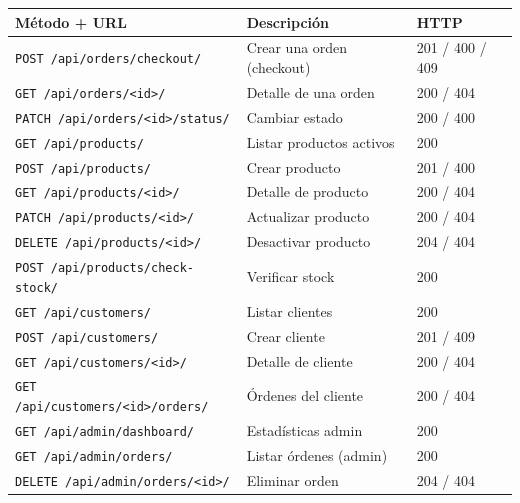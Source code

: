 \documentclass[12pt, a4paper]{article}
\begin{document}
\begin{center}
\begin{tabular}{@{}lll@{}}
\toprule
\textbf{Método + URL} & \textbf{Descripción} & \textbf{HTTP} \\
\midrule
\texttt{POST /api/orders/checkout/} & Crear una orden (checkout) & 201 / 400 / 409 \\
\texttt{GET /api/orders/<id>/}      & Detalle de una orden & 200 / 404 \\
\texttt{PATCH /api/orders/<id>/status/} & Cambiar estado & 200 / 400 \\
\midrule
\texttt{GET /api/products/}         & Listar productos activos & 200 \\
\texttt{POST /api/products/}        & Crear producto & 201 / 400 \\
\texttt{GET /api/products/<id>/}    & Detalle de producto & 200 / 404 \\
\texttt{PATCH /api/products/<id>/}  & Actualizar producto & 200 / 404 \\
\texttt{DELETE /api/products/<id>/} & Desactivar producto & 204 / 404 \\
\texttt{POST /api/products/check-stock/} & Verificar stock & 200 \\
\midrule
\texttt{GET /api/customers/}        & Listar clientes & 200 \\
\texttt{POST /api/customers/}       & Crear cliente & 201 / 409 \\
\texttt{GET /api/customers/<id>/}   & Detalle de cliente & 200 / 404 \\
\texttt{GET /api/customers/<id>/orders/} & Órdenes del cliente & 200 / 404 \\
\midrule
\texttt{GET /api/admin/dashboard/}  & Estadísticas admin & 200 \\
\texttt{GET /api/admin/orders/}     & Listar órdenes (admin) & 200 \\
\texttt{DELETE /api/admin/orders/<id>/} & Eliminar orden & 204 / 404 \\
\bottomrule
\end{tabular}
\end{center}
\end{document}
